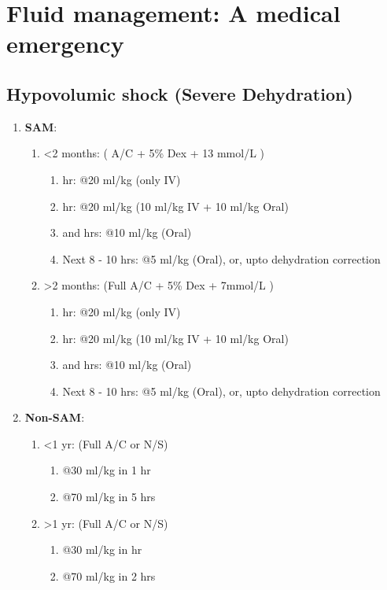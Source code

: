\documentclass[11pt,a4paper]{report}
\begin{document}
\chapter[Fluid management]{Fluid management: A medical emergency}
\section[Hypovolumic shock]{Hypovolumic shock (Severe Dehydration)}
\begin{enumerate}
	\item \textbf{SAM}:
	\begin{enumerate}
		\item \textless2 months: ( A/C + 5\% Dex + 13 mmol/L )
		\begin{enumerate}
			\item {} hr: @20 ml/kg (only IV)
			\item {} hr: @20 ml/kg (10 ml/kg IV + 10 ml/kg Oral)
			\item {} and  hrs: @10 ml/kg (Oral)
			\item Next 8 - 10 hrs: @5 ml/kg (Oral), 
			or, upto dehydration correction
		\end{enumerate}
		\item \textgreater2 months: (Full A/C + 5\% Dex + 7mmol/L )
		\begin{enumerate}
			\item {} hr: @20 ml/kg (only IV)
			\item {} hr: @20 ml/kg (10 ml/kg IV + 10 ml/kg Oral)
			\item {} and  hrs: @10 ml/kg (Oral)
			\item Next 8 - 10 hrs: @5 ml/kg (Oral), 
			or, upto dehydration correction
		\end{enumerate}
	\end{enumerate}
	
	\item \textbf{Non-SAM}:
	\begin{enumerate}
		\item \textless1 yr: (Full A/C or N/S) 
		\begin{enumerate}
			\item {} @30 ml/kg in 1 hr
			\item {} @70 ml/kg in 5 hrs
		\end{enumerate}
		\item \textgreater1 yr: (Full A/C or N/S)
		\begin{enumerate}
			\item {} @30 ml/kg in  hr
			\item {} @70 ml/kg in 2 hrs
		\end{enumerate}
	\end{enumerate}
\end{enumerate}
\end{document}
